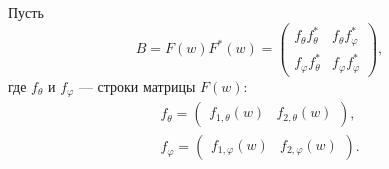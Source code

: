 Пусть
\[
    B
    = F(w) F^*(w)
    = \begin{pmatrix}
          f_\theta f_\theta^*  & f_{\theta} f_\varphi^* \\
          f_\varphi f_\theta^* & f_\varphi f_\varphi^*
    \end{pmatrix} ,
\]
где $f_\theta$ и $f_\varphi$ --- строки матрицы $F(w)$:
\begin{gather*}
    f_\theta
    = \begin{pmatrix}
          f_{1,\theta}(w) & f_{2,\theta}(w)
    \end{pmatrix}, \\
%
    f_\varphi
    = \begin{pmatrix}
          f_{1,\varphi}(w) & f_{2,\varphi}(w)
    \end{pmatrix} .
\end{gather*}

